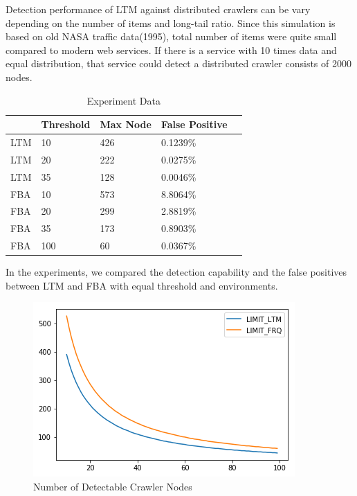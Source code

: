 \documentclass[sigconf,anonymous=true]{acmart}
\begin{document}
\begin{itemize}
Detection performance of LTM against distributed crawlers can be vary depending on the number of items and long-tail ratio. Since this simulation is based on old NASA traffic data(1995), total number of items were quite small compared to modern web services. If there is a service with 10 times data and equal distribution, that service could detect a distributed crawler consists of 2000 nodes.
\end{itemize}


\begin{table}[H]
  \caption{Experiment Data}
    \begin{tabular}{| l | l | l | l | l | }
    \hline
    & Threshold & Max Node & False Positive \\ \hline
    LTM & 10 & 426 & 0.1239\% \\ 
    LTM & 20 & 222 & 0.0275\% \\ 
    LTM & 35 & 128 & 0.0046\% \\ 
    FBA & 10 & 573 & 8.8064\% \\
    FBA & 20 & 299 & 2.8819\% \\ 
    FBA & 35 & 173 & 0.8903\% \\ 
    FBA & 100 & 60 & 0.0367\% \\ \hline
    \end{tabular}
\end{table}

In the experiments, we compared the detection capability and the false positives between LTM and FBA with equal threshold and environments.

\begin{figure}[H]
    \centering
    \includegraphics[width=0.85\columnwidth]{figs/figure_limit_compare.png}
    \caption{Number of Detectable Crawler Nodes}
    \label{fig:my_label}
\end{figure}
\end{document}
